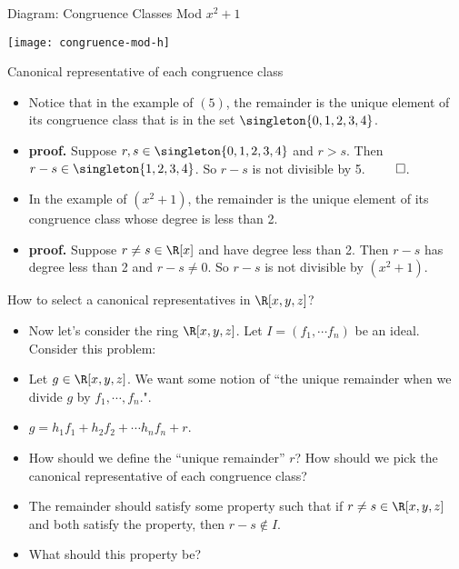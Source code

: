 \documentclass{beamer}
\begin{document}
\begin{frame}{Diagram: Congruence Classes Mod $x^2 + 1$}

\begin{center}
\texttt{[image: congruence-mod-h]}
\end{center}

\end{frame}



\begin{frame}{Canonical representative of each congruence class}

\begin{itemize}
  \item Notice that in the example of $(5)$, the remainder is the unique element of its congruence class that is in the set $\singleton{0,1,2,3,4}$.
  \item \textbf{proof.} Suppose $r,s\in \singleton{0,1,2,3,4}$ and $r> s$. Then $r-s\in \singleton{1,2,3,4}$. So $r-s$ is not divisible by 5. $\qed$.
  \item In the example of $(x^2+1)$, the remainder is the unique element of its congruence class whose degree is less than 2.
  \item \textbf{proof.} Suppose $r\not=s\in\R[x]$ and have degree less than 2. Then $r-s$ has degree less than 2 and $r-s\not=0$. So $r-s$ is not divisible
  by $(x^2+1)$.
\end{itemize}

\end{frame}



\begin{frame}{How to select a canonical representatives in $\R[x,y,z]$?}

\begin{itemize}
  \item Now let's consider the ring $\R[x,y,z]$. Let $I=(f_1,\cdots f_n)$ be an ideal. Consider this problem:
  \item Let $g\in\R[x,y,z]$. We want some notion of ``the unique remainder when we divide $g$ by $f_1,\cdots, f_n$.".
  \item $g = h_1 f_1 + h_2 f_2 + \cdots h_n f_n + r$.
  \item How should we define the ``unique remainder'' $r$? How should we pick the canonical representative of each congruence class?
  \item The remainder should satisfy some property such that if $r \not= s \in \R[x,y,z]$ and both satisfy the property, then $r-s\notin I$.
  \item What should this property be?
\end{itemize}

\end{frame}
\end{document}
